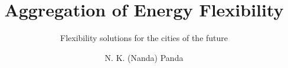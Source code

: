 \documentclass{tudelft-report}
\begin{document}
\frontmatter


\title{\textbf{Aggregation of Energy Flexibility}}
\subtitle{Flexibility solutions for the cities of the future} 
\author{N. K. (Nanda) Panda}
\subject{Ph.D First Year Report (23 September 2022)}


\makecover



% 
% 

\tableofcontents



\mainmatter








\setcounter{biburlnumpenalty}{7000}
\setcounter{biburllcpenalty}{7000}
\setcounter{biburlucpenalty}{7000}

\printbibliography[heading=bibintoc,title=References]


\appendix









% 


% 
% 
\end{document}
